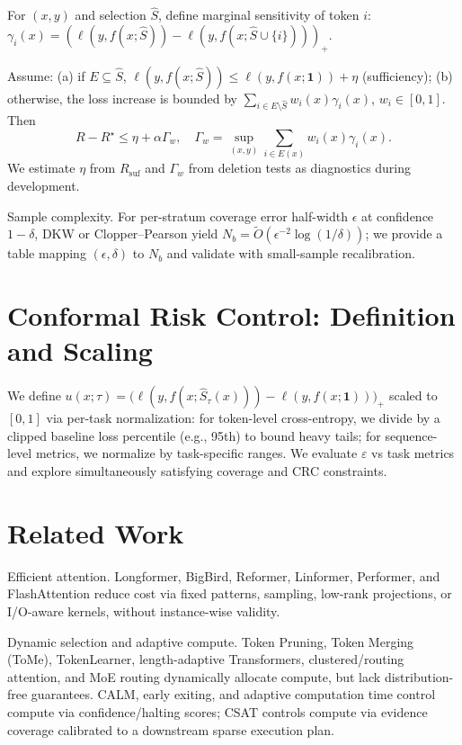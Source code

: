 \documentclass[11pt]{article}
\begin{document}
\begin{definition}\label{def:gamma}
For $(x,y)$ and selection $\hat{S}$, define marginal sensitivity of token $i$:
$\gamma_i(x)=(\ell(y,f(x;\hat{S}))-\ell(y,f(x;\hat{S}\cup\{i\})))_+.$
\end{definition}

\begin{theorem}\label{thm:risk}
Assume: (a) if $E\subseteq \hat{S}$, $\ell(y,f(x;\hat{S}))\le \ell(y,f(x;\mathbf{1}))+\eta$ (sufficiency); (b) otherwise, the loss increase is bounded by $\sum_{i\in E\setminus \hat{S}} w_i(x)\gamma_i(x)$, $w_i\in[0,1]$. Then
\[
R - R^\star \le \eta + \alpha \Gamma_w,\quad \Gamma_w=\sup_{(x,y)} \sum_{i\in E(x)}w_i(x)\gamma_i(x).
\]
We estimate $\eta$ from $R_{\text{suf}}$ and $\Gamma_w$ from deletion tests as diagnostics during development.
\end{theorem}

Sample complexity. For per-stratum coverage error half-width $\epsilon$ at confidence $1-\delta$, DKW or Clopper–Pearson yield $N_b=\tilde{O}(\epsilon^{-2}\log(1/\delta))$; we provide a table mapping $(\epsilon,\delta)$ to $N_b$ and validate with small-sample recalibration.

\section{Conformal Risk Control: Definition and Scaling}
\label{sec:crc-def}
We define $u(x;\tau) = \big(\ell(y,f(x;\hat{S}_\tau(x))) - \ell(y,f(x;\mathbf{1}))\big)_+$ scaled to $[0,1]$ via per-task normalization: for token-level cross-entropy, we divide by a clipped baseline loss percentile (e.g., 95th) to bound heavy tails; for sequence-level metrics, we normalize by task-specific ranges. We evaluate $\varepsilon$ vs task metrics and explore simultaneously satisfying coverage and CRC constraints.

\section{Related Work}
Efficient attention. Longformer, BigBird, Reformer, Linformer, Performer, and FlashAttention reduce cost via fixed patterns, sampling, low-rank projections, or I/O-aware kernels, without instance-wise validity.

Dynamic selection and adaptive compute. Token Pruning, Token Merging (ToMe), TokenLearner, length-adaptive Transformers, clustered/routing attention, and MoE routing dynamically allocate compute, but lack distribution-free guarantees. CALM, early exiting, and adaptive computation time control compute via confidence/halting scores; CSAT controls compute via evidence coverage calibrated to a downstream sparse execution plan.
\end{document}
